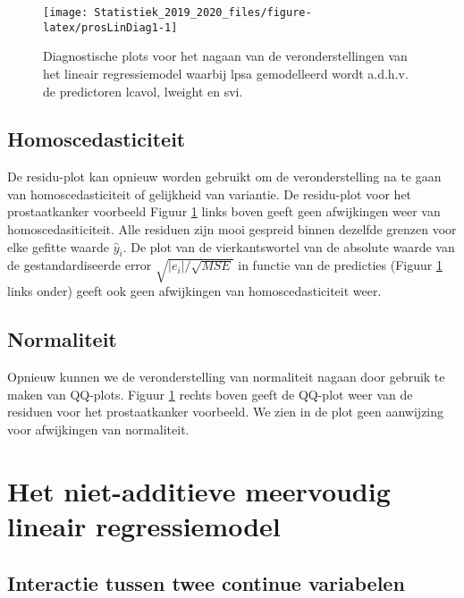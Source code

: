 \documentclass[12pt,dutch,coursenotes]{book}
\theoremstyle{definition}
\theoremstyle{definition}
\theoremstyle{definition}
\theoremstyle{remark}
\begin{document}
\begin{figure}

{\centering \texttt{[image: Statistiek\_2019\_2020\_files/figure-latex/prosLinDiag1-1]} 

}

\caption{Diagnostische plots voor het nagaan van de veronderstellingen van het lineair regressiemodel waarbij lpsa gemodelleerd wordt a.d.h.v. de predictoren lcavol, lweight en svi.}\label{fig:prosLinDiag1}
\end{figure}

\subsection{Homoscedasticiteit}\label{homoscedasticiteit}

De residu-plot kan opnieuw worden gebruikt om de veronderstelling na te
gaan van homoscedasticiteit of gelijkheid van variantie. De residu-plot
voor het prostaatkanker voorbeeld Figuur \ref{fig:prosLinDiag1} links
boven geeft geen afwijkingen weer van homoscedasiticiteit. Alle residuen
zijn mooi gespreid binnen dezelfde grenzen voor elke gefitte waarde
\(\hat y_i\). De plot van de vierkantswortel van de absolute waarde van
de gestandardiseerde error \(\sqrt{|e_i|/\sqrt{MSE}}\) in functie van de
predicties (Figuur \ref{fig:prosLinDiag1} links onder) geeft ook geen
afwijkingen van homoscedasticiteit weer.

\subsection{Normaliteit}\label{normaliteit}

Opnieuw kunnen we de veronderstelling van normaliteit nagaan door
gebruik te maken van QQ-plots. Figuur \ref{fig:prosLinDiag1} rechts
boven geeft de QQ-plot weer van de residuen voor het prostaatkanker
voorbeeld. We zien in de plot geen aanwijzing voor afwijkingen van
normaliteit.

\section{Het niet-additieve meervoudig lineair
regressiemodel}\label{het-niet-additieve-meervoudig-lineair-regressiemodel}

\subsection{Interactie tussen twee continue
variabelen}\label{sec:intCont}
\end{document}
